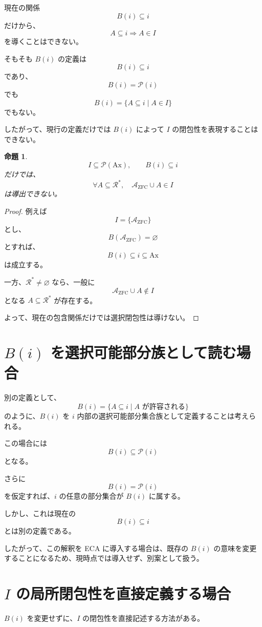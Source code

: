 \documentclass[a4paper,11pt]{article}
\newtheorem{proposition}[definition]{命題}
\newcommand{\Ax}{\mathrm{Ax}}
\begin{document}
現在の関係
\[
B(i)\subseteq i
\]
だけから、
\[
A\subseteq i
\Longrightarrow A\in I
\]
を導くことはできない。

そもそも $B(i)$ の定義は
\[
B(i)\subseteq i
\]
であり、
\[
B(i)=\mathcal{P}(i)
\]
でも
\[
B(i)=\{A\subseteq i\mid A\in I\}
\]
でもない。

したがって、現行の定義だけでは $B(i)$ によって $I$ の閉包性を表現することはできない。

\begin{proposition}
\[
I\subseteq\mathcal{P}(\Ax),
\qquad
B(i)\subseteq i
\]
だけでは、
\[
\forall A\subseteq\mathcal{R}^*,
\quad
\mathcal{A}_{\mathrm{ZFC}}\cup A\in I
\]
は導出できない。
\end{proposition}

\begin{proof}
例えば
\[
I=\{\mathcal{A}_{\mathrm{ZFC}}\}
\]
とし、
\[
B(\mathcal{A}_{\mathrm{ZFC}})
=
\varnothing
\]
とすれば、
\[
B(i)\subseteq i\subseteq\Ax
\]
は成立する。

一方、$\mathcal{R}^*\neq\varnothing$ なら、一般に
\[
\mathcal{A}_{\mathrm{ZFC}}\cup A
\notin I
\]
となる $A\subseteq\mathcal{R}^*$ が存在する。

よって、現在の包含関係だけでは選択閉包性は導けない。
\end{proof}

\section{$B(i)$ を選択可能部分族として読む場合}

別の定義として、
\[
B(i)
=
\{A\subseteq i\mid A\text{ が許容される}\}
\]
のように、$B(i)$ を $i$ 内部の選択可能部分集合族として定義することは考えられる。

この場合には
\[
B(i)\subseteq\mathcal{P}(i)
\]
となる。

さらに
\[
B(i)=\mathcal{P}(i)
\]
を仮定すれば、$i$ の任意の部分集合が $B(i)$ に属する。

しかし、これは現在の
\[
B(i)\subseteq i
\]
とは別の定義である。

したがって、この解釈を ECA に導入する場合は、既存の $B(i)$ の意味を変更することになるため、現時点では導入せず、別案として扱う。

\section{$I$ の局所閉包性を直接定義する場合}
$B(i)$ を変更せずに、$I$ の閉包性を直接記述する方法がある。
\end{document}
